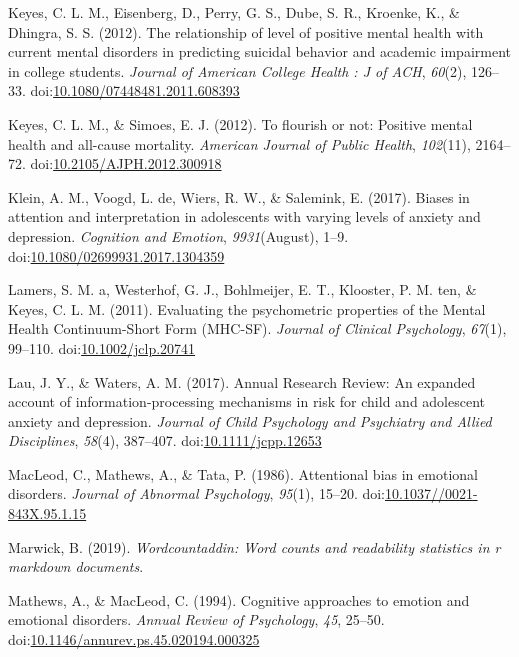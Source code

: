 \documentclass[man,floatsintext]{apa6}
\begin{document}
\leavevmode\hypertarget{ref-Keyes2012a}{}%
Keyes, C. L. M., Eisenberg, D., Perry, G. S., Dube, S. R., Kroenke, K., \& Dhingra, S. S. (2012). The relationship of level of positive mental health with current mental disorders in predicting suicidal behavior and academic impairment in college students. \emph{Journal of American College Health : J of ACH}, \emph{60}(2), 126--33. doi:\href{https://doi.org/10.1080/07448481.2011.608393}{10.1080/07448481.2011.608393}

\leavevmode\hypertarget{ref-Keyes2012}{}%
Keyes, C. L. M., \& Simoes, E. J. (2012). To flourish or not: Positive mental health and all-cause mortality. \emph{American Journal of Public Health}, \emph{102}(11), 2164--72. doi:\href{https://doi.org/10.2105/AJPH.2012.300918}{10.2105/AJPH.2012.300918}

\leavevmode\hypertarget{ref-klein_biases_2017}{}%
Klein, A. M., Voogd, L. de, Wiers, R. W., \& Salemink, E. (2017). Biases in attention and interpretation in adolescents with varying levels of anxiety and depression. \emph{Cognition and Emotion}, \emph{9931}(August), 1--9. doi:\href{https://doi.org/10.1080/02699931.2017.1304359}{10.1080/02699931.2017.1304359}

\leavevmode\hypertarget{ref-Lamers2011}{}%
Lamers, S. M. a, Westerhof, G. J., Bohlmeijer, E. T., Klooster, P. M. ten, \& Keyes, C. L. M. (2011). Evaluating the psychometric properties of the Mental Health Continuum-Short Form (MHC-SF). \emph{Journal of Clinical Psychology}, \emph{67}(1), 99--110. doi:\href{https://doi.org/10.1002/jclp.20741}{10.1002/jclp.20741}

\leavevmode\hypertarget{ref-lau_annual_2017}{}%
Lau, J. Y., \& Waters, A. M. (2017). Annual Research Review: An expanded account of information-processing mechanisms in risk for child and adolescent anxiety and depression. \emph{Journal of Child Psychology and Psychiatry and Allied Disciplines}, \emph{58}(4), 387--407. doi:\href{https://doi.org/10.1111/jcpp.12653}{10.1111/jcpp.12653}

\leavevmode\hypertarget{ref-MacLeod1986}{}%
MacLeod, C., Mathews, A., \& Tata, P. (1986). Attentional bias in emotional disorders. \emph{Journal of Abnormal Psychology}, \emph{95}(1), 15--20. doi:\href{https://doi.org/10.1037//0021-843X.95.1.15}{10.1037//0021-843X.95.1.15}

\leavevmode\hypertarget{ref-R-wordcountaddin}{}%
Marwick, B. (2019). \emph{Wordcountaddin: Word counts and readability statistics in r markdown documents}.

\leavevmode\hypertarget{ref-Mathews1994}{}%
Mathews, A., \& MacLeod, C. (1994). Cognitive approaches to emotion and emotional disorders. \emph{Annual Review of Psychology}, \emph{45}, 25--50. doi:\href{https://doi.org/10.1146/annurev.ps.45.020194.000325}{10.1146/annurev.ps.45.020194.000325}
\end{document}
